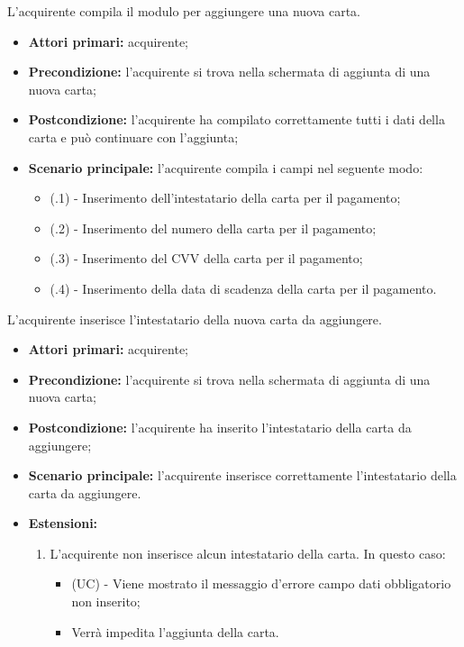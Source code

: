L'acquirente compila il modulo per aggiungere una nuova carta.
\begin{itemize}
	\item \textbf{Attori primari:} acquirente;
	\item \textbf{Precondizione:} l'acquirente si trova nella schermata di aggiunta di una nuova carta;
	\item \textbf{Postcondizione:} l'acquirente ha compilato correttamente tutti i dati della carta e può continuare con l'aggiunta;
	\item \textbf{Scenario principale:} l'acquirente compila i campi nel seguente modo:
	\begin{itemize}
		\item (\actualSubUC.1) - Inserimento dell'intestatario della carta per il pagamento;
		\item (\actualSubUC.2) - Inserimento del numero della carta per il pagamento;
		\item (\actualSubUC.3) - Inserimento del CVV della carta per il pagamento;
		\item (\actualSubUC.4) - Inserimento della data di scadenza della carta per il pagamento.
	\end{itemize}
\end{itemize}

\resetSubSubUC

L'acquirente inserisce l'intestatario della nuova carta da aggiungere.
\begin{itemize}
    \item \textbf{Attori primari:} acquirente;
    \item \textbf{Precondizione:} l'acquirente si trova nella schermata di aggiunta di una nuova carta;
    \item \textbf{Postcondizione:} l'acquirente ha inserito l'intestatario della carta da aggiungere;
    \item \textbf{Scenario principale:} l'acquirente inserisce correttamente l'intestatario della carta da aggiungere.
    \item \textbf{Estensioni:}
    \begin{enumerate}[label=\lett]
        \item L'acquirente non inserisce alcun intestatario della carta. In questo caso:
        \begin{itemize}
            \item (UC) - Viene mostrato il messaggio d'errore campo dati obbligatorio non inserito;
            \item Verrà impedita l'aggiunta della carta.
        \end{itemize}
    \end{enumerate}
\end{itemize}

